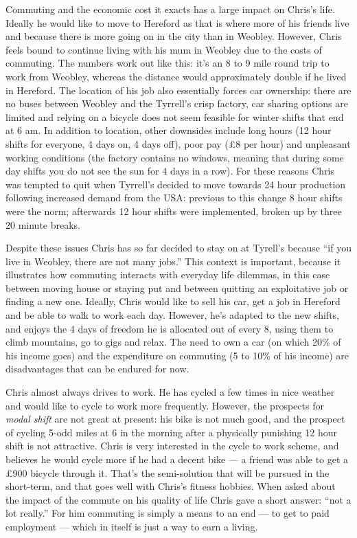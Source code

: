 \documentclass[a4paper, 11pt, twoside]{Thesis}
\begin{document}
Commuting and the economic cost it exacts has a large impact on Chris's life.
Ideally he would like to move to Hereford as that is where more of his
friends live and because there is more going on in the city than in Weobley.
However, Chris feels
bound to continue living with his mum in Weobley due to the costs of commuting.
The numbers work out like this: it's an 8 to 9 mile round trip to work from
Weobley, whereas the distance would approximately double if he lived in Hereford.
The location of his job also essentially forces car ownership: there are no buses
between Weobley and the Tyrrell's crisp factory, car sharing options are limited
and relying on a bicycle does not seem feasible for winter shifts that end at 6 am.
In addition to location, other downsides include long hours (12 hour shifts for
everyone, 4 days on, 4 days off), poor pay (\pounds8 per hour) and unpleasant
working conditions (the factory contains no windows, meaning that during
some day shifts you do not see the sun for 4 days in a row). For these reasons
Chris was tempted to quit when Tyrrell's decided to move towards 24 hour
production following increased demand from the USA: previous to this change
8 hour shifts were the norm; afterwards 12 hour shifts were implemented, broken up by
three 20 minute breaks.


Despite these issues Chris has so far
decided to stay on at Tyrell's because
``if you live in Weobley, there are not many jobs.''
This context is important, because it illustrates how commuting
interacts with everyday life dilemmas, in this case
between moving house or staying put and
between quitting an exploitative job or finding a new one.
Ideally, Chris would like to sell his car, get a job in Hereford and be able
to walk to work each day. However, he's adapted to the new shifts, and
enjoys the 4 days of freedom he is allocated out of every 8, using them
to climb mountains, go to gigs and relax. The need to own a car
(on which 20\% of his income goes) and the expenditure on commuting
(5 to 10\% of his income) are disadvantages that can be endured for now.

Chris almost always drives to work. He has cycled a few times in nice weather
and would like to cycle to work more frequently. However, the
prospects for \emph{modal shift} are not great at present: his bike is not
much good, and the prospect of cycling 5-odd miles at 6 in the morning
after a physically punishing 12 hour shift is not attractive.
Chris is very interested in the cycle to work scheme, and believes he
would cycle more if he had a decent bike --- a friend was able to
get a \pounds900 bicycle through it. That's the semi-solution that
will be pursued in the short-term, and that goes well with Chris's
fitness hobbies.
When asked about the impact of the commute on his quality of life
Chris gave a short answer: ``not a lot really.'' For him commuting
is simply a means to an end --- to get to paid employment --- which
in itself is just a way to earn a living.
\end{document}
